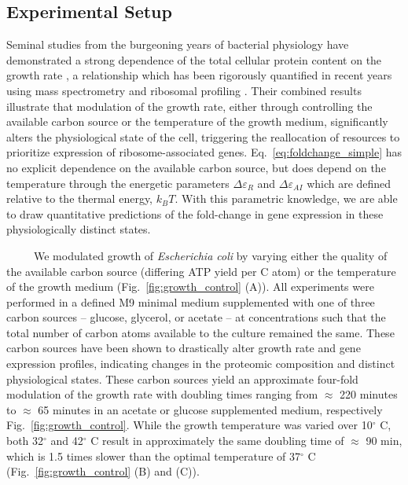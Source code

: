 \documentclass[12pt]{caltech_thesis}
\begin{document}
\hypertarget{experimental-setup}{%
\subsection{Experimental Setup}\label{experimental-setup}}

Seminal studies from the burgeoning years of bacterial physiology have
demonstrated a strong dependence of the total cellular protein content
on the growth rate \autocite{schaechter1958}, a relationship which has
been rigorously quantified in recent years using mass spectrometry
\autocite{schmidt2016} and ribosomal profiling \autocite{li2014}. Their
combined results illustrate that modulation of the growth rate, either
through controlling the available carbon source or the temperature of
the growth medium, significantly alters the physiological state of the
cell, triggering the reallocation of resources to prioritize expression
of ribosome-associated genes. Eq.~\ref{eq:foldchange_simple} has no
explicit dependence on the available carbon source, but does depend on
the temperature through the energetic parameters
\(\Delta\varepsilon_{R}\) and \(\Delta\varepsilon_{AI}\) which are
defined relative to the thermal energy, \(k_BT\). With this parametric
knowledge, we are able to draw quantitative predictions of the
fold-change in gene expression in these physiologically distinct states.

~~~~~We modulated growth of \emph{Escherichia coli} by varying either
the quality of the available carbon source (differing ATP yield per C
atom) or the temperature of the growth medium
(Fig.~\ref{fig:growth_control} (A)). All experiments were performed in a
defined M9 minimal medium supplemented with one of three carbon sources
-- glucose, glycerol, or acetate -- at concentrations such that the
total number of carbon atoms available to the culture remained the same.
These carbon sources have been shown to drastically alter growth rate
and gene expression profiles, indicating changes in the proteomic
composition and distinct physiological states. These carbon sources
yield an approximate four-fold modulation of the growth rate with
doubling times ranging from \(\approx\) 220 minutes to \(\approx\) 65
minutes in an acetate or glucose supplemented medium, respectively
Fig.~\ref{fig:growth_control}. While the growth temperature was varied
over 10\(^\circ\) C, both 32\(^\circ\) and 42\(^\circ\) C result in
approximately the same doubling time of \(\approx\) 90 min, which is 1.5
times slower than the optimal temperature of 37\(^\circ\) C
(Fig.~\ref{fig:growth_control} (B) and (C)).
\end{document}
